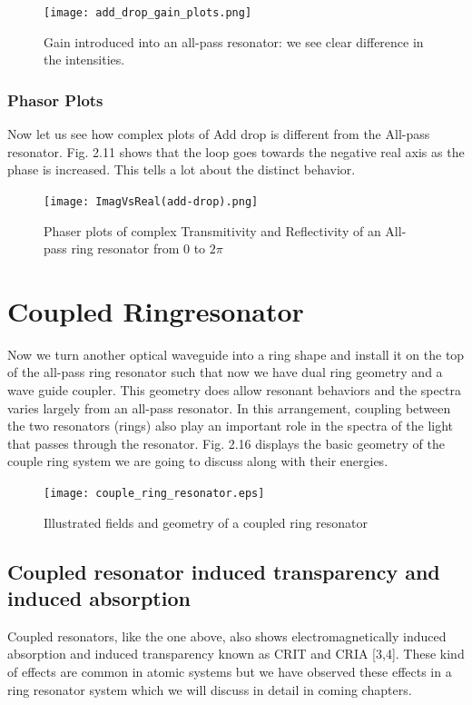 \begin{figure}[h]
\centering
\texttt{[image: add\_drop\_gain\_plots.png]}
\caption{Gain introduced into an all-pass resonator: we see clear difference in the intensities.}
\end{figure}
\newpage

\subsubsection{Phasor Plots}
Now let us see how complex plots of Add drop is different from the All-pass resonator. Fig. 2.11 shows that the loop goes towards the negative real axis as the phase is increased. This tells a lot about the distinct behavior.

\begin{figure}[h]
\centering
\texttt{[image: ImagVsReal(add-drop).png]}
\caption{Phaser plots of complex Transmitivity and Reflectivity of an All-pass ring resonator from 0 to $2\pi$}
\end{figure}
\newpage

\section{Coupled Ringresonator}
Now we turn another optical waveguide into a ring shape and install it on the top of the all-pass ring resonator such that now we have dual ring geometry and a wave guide coupler. This geometry does allow resonant behaviors and the spectra varies largely from an all-pass resonator.
In this arrangement, coupling between the two resonators (rings) also play an important role in the spectra of the light that passes through the resonator. Fig. 2.16 displays the basic geometry of the couple ring system we are going to discuss along with their energies. 

\begin{figure}[h]
\centering
\texttt{[image: couple\_ring\_resonator.eps]}
\caption{Illustrated fields and geometry of a coupled ring resonator}
\end{figure}


\subsection{Coupled resonator induced transparency and induced absorption}
Coupled resonators, like the one above, also shows electromagnetically induced absorption and induced transparency known as CRIT and CRIA [3,4]. These kind of effects are common in atomic systems but we have observed these effects in a ring resonator system which we will discuss in detail in coming chapters.

